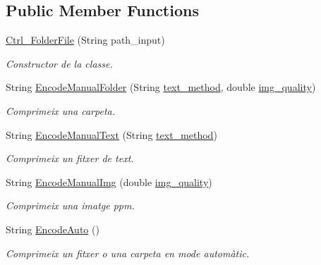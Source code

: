 \subsection*{Public Member Functions}
\begin{DoxyCompactItemize}
\item 
\hyperlink{classdomini_1_1folders_1_1Ctrl__FolderFile_aabe2038931ca63100a2fc4b12936142d}{Ctrl\+\_\+\+Folder\+File} (String path\+\_\+input)
\begin{DoxyCompactList}\small\item\em Constructor de la classe. \end{DoxyCompactList}\item 
String \hyperlink{classdomini_1_1folders_1_1Ctrl__FolderFile_a8cb5f1a979d5882dd244d69806d5b237}{Encode\+Manual\+Folder} (String \hyperlink{classdomini_1_1folders_1_1Ctrl__FolderFile_a75ef571be454360b835f552d2cf20741}{text\+\_\+method}, double \hyperlink{classdomini_1_1folders_1_1Ctrl__FolderFile_a7990a74c394d53a58ebbf4a7872c700d}{img\+\_\+quality})
\begin{DoxyCompactList}\small\item\em Comprimeix una carpeta. \end{DoxyCompactList}\item 
String \hyperlink{classdomini_1_1folders_1_1Ctrl__FolderFile_a77b9d8244dd36e77516a9dc43ec50ed8}{Encode\+Manual\+Text} (String \hyperlink{classdomini_1_1folders_1_1Ctrl__FolderFile_a75ef571be454360b835f552d2cf20741}{text\+\_\+method})
\begin{DoxyCompactList}\small\item\em Comprimeix un fitxer de text. \end{DoxyCompactList}\item 
String \hyperlink{classdomini_1_1folders_1_1Ctrl__FolderFile_aa12af32101598eebcaaad4d0dbe69902}{Encode\+Manual\+Img} (double \hyperlink{classdomini_1_1folders_1_1Ctrl__FolderFile_a7990a74c394d53a58ebbf4a7872c700d}{img\+\_\+quality})
\begin{DoxyCompactList}\small\item\em Comprimeix una imatge ppm. \end{DoxyCompactList}\item 
String \hyperlink{classdomini_1_1folders_1_1Ctrl__FolderFile_aa88b27fc271590c8c16642db5c1bb329}{Encode\+Auto} ()
\begin{DoxyCompactList}\small\item\em Comprimeix un fitxer o una carpeta en mode automàtic. \end{DoxyCompactList}\item 

\end{DoxyCompactItemize}
